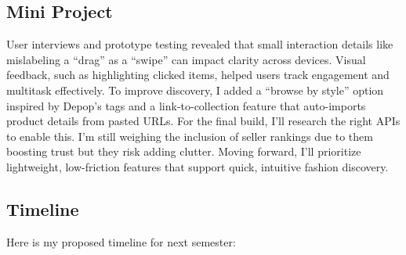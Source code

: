 \documentclass[10pt,twocolumn]{article}
\begin{document}
\subsection{Mini Project}
User interviews and prototype testing revealed that small interaction details like mislabeling a “drag” as a “swipe” can impact clarity across devices. Visual feedback, such as highlighting clicked items, helped users track engagement and multitask effectively. To improve discovery, I added a “browse by style” option inspired by Depop’s tags and a link-to-collection feature that auto-imports product details from pasted URLs. For the final build, I’ll research the right APIs to enable this. I’m still weighing the inclusion of seller rankings due to them boosting trust but they risk adding clutter. Moving forward, I’ll prioritize lightweight, low-friction features that support quick, intuitive fashion discovery.

\subsection{Timeline}
Here is my proposed timeline for next semester: 
\end{document}
